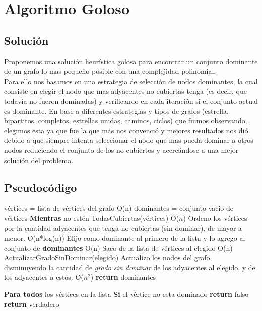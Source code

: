 \section{Algoritmo Goloso}

\subsection{Soluci\'on}

Proponemos una solución heurística golosa para encontrar un conjunto dominante de un grafo lo mas pequeño posible con una complejidad polinomial.\\
Para ello nos basamos en una estrategia de selección de nodos dominantes, la cual consiste en elegir el nodo que mas adyacentes no cubiertas tenga (es decir, que todavía no fueron dominadas) y verificando en cada iteración si el conjunto actual es dominante. En base a diferentes estrategias y tipos de grafos (estrella, bipartitos, completos, estrellas unidas, caminos, ciclos) que fuimos observando, elegimos esta ya que fue la que más nos convenció y mejores resultados nos dió debido a que siempre intenta seleccionar el nodo que mas pueda dominar a otros nodos reduciendo el conjunto de los no cubiertos y acercándose a una mejor solución del problema. 

\subsection{Pseudocódigo}

\begin{codebox}
\li	vértices = lista de vértices del grafo	\RComment O(n)
\li	dominantes = conjunto vacio de vértices	
\li	\textbf{Mientras} no estén TodasCubiertas(vértices) \Do \RComment O($n$)
\li 		Ordeno los vértices por la cantidad adyacentes que tenga no cubiertas (sin dominar), de mayor a menor. \RComment O(n*log(n))
\li 		Elijo como dominante al primero de la lista y lo agrego al conjunto de \textbf{dominantes} \RComment O(n)
\li 		Saco de la lista de vértices al elegido \RComment O(n)
\li 		ActualizarGradoSinDominar(elegido) \RComment Actualizo los nodos del grafo,\\ disminuyendo la cantidad de \textit{grado sin dominar} de los adyacentes al elegido, y de los adyacentes a estos.  O($n^2$)
\End
\li	\textbf{return} dominantes
\end{codebox}

\begin{codebox}
\li 	\textbf{Para todos} los vértices en la lista \Do
\li 		\textbf{Si} el vértice no esta dominado \Do
\li 			\textbf{return} falso \End \End
\li 	\textbf{return} verdadero
\end{codebox}

